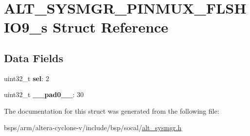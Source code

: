 \hypertarget{structALT__SYSMGR__PINMUX__FLSHIO9__s}{}\section{A\+L\+T\+\_\+\+S\+Y\+S\+M\+G\+R\+\_\+\+P\+I\+N\+M\+U\+X\+\_\+\+F\+L\+S\+H\+I\+O9\+\_\+s Struct Reference}
\label{structALT__SYSMGR__PINMUX__FLSHIO9__s}
\subsection*{Data Fields}
\begin{DoxyCompactItemize}
\item 
\mbox{\label{structALT__SYSMGR__PINMUX__FLSHIO9__s_a0f3b18903427bcb31e4f2de40da1b2bb}} 
uint32\+\_\+t {\bfseries sel}\+: 2
\item 
\mbox{\label{structALT__SYSMGR__PINMUX__FLSHIO9__s_a54502a39f7470284278a3ca35c560a19}} 
uint32\+\_\+t {\bfseries \+\_\+\+\_\+pad0\+\_\+\+\_\+}\+: 30
\end{DoxyCompactItemize}


The documentation for this struct was generated from the following file\+:\begin{DoxyCompactItemize}
\item 
bsps/arm/altera-\/cyclone-\/v/include/bsp/socal/\mbox{\hyperlink{alt__sysmgr_8h}{alt\+\_\+sysmgr.\+h}}\end{DoxyCompactItemize}
